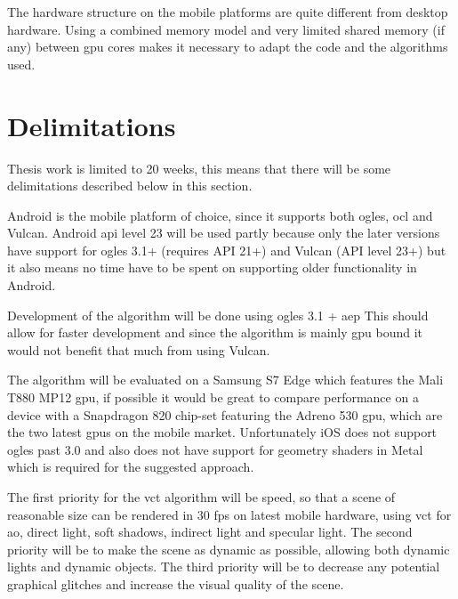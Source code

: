 The hardware structure on the mobile platforms are quite different from desktop hardware. Using a combined memory model and very limited shared memory (if any) between \gls{gpu} cores makes it necessary to adapt the code and the algorithms used.

\section{Delimitations}

Thesis work is limited to 20 weeks, this means that there will be some delimitations described below in this section.

Android is the mobile platform of choice, since it supports both \gls{ogles}, \gls{ocl} and Vulcan. Android \acrshort{api} level 23 will be used partly because only the later versions have support for \gls{ogles} 3.1+ (requires API 21+) and Vulcan (API level 23+) but it also means no time have to be spent on supporting older functionality in Android.

Development of the algorithm will be done using \gls{ogles} 3.1 + \gls{aep} This should allow for faster development and since the algorithm is mainly \gls{gpu} bound it would not benefit that much from using Vulcan.

The algorithm will be evaluated on a Samsung S7 Edge which features the Mali T880 MP12 \gls{gpu}, if possible it would be great to compare performance on a device with a Snapdragon 820 chip-set featuring the Adreno 530 \gls{gpu}, which are the two latest \glspl{gpu} on the mobile market. Unfortunately iOS does not support \gls{ogles} past 3.0 and also does not have support for geometry shaders in Metal which is required for the suggested approach.

The first priority for the \gls{vct} algorithm will be speed, so that a scene of reasonable size can be rendered in 30 fps on latest mobile hardware, using \gls{vct} for \gls{ao}, direct light, soft shadows, indirect light and specular light. The second priority will be to make the scene as dynamic as possible, allowing both dynamic lights and dynamic objects. The third priority will be to decrease any potential graphical glitches and increase the visual quality of the scene. 